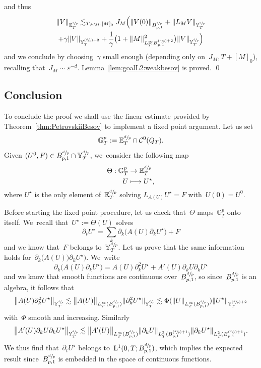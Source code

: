 \documentclass[JEP,XML,SOM,Unicode,published]{cedram}
\newcommand\mto{\mathchoice{\longmapsto}{\mapsto}{\mapsto}{\mapsto}}
\newcommand{\Psfrac}[2]{(\sfrac{#1}{#2})}
\theoremstyle{definition}
\renewcommand\L{\mathrm{L}}
\let\ep\varepsilon
\begin{document}
and thus
\begin{multline*}
\|V\|_{{\mathbb E}^{\sfrac dp}_T} \lesssim_{T,\omega_M,[M]_0} J_M\Bigl(\| V (0)\|_{B^{\sfrac dp}_{p,1}} + \| L_{M }V\|_{{\mathbb Y}^{\sfrac dp}_T} \\+ \gamma \|V\|_{{{\mathbb Y}^{\Psfrac dp+2}_T }} + \frac1\gamma\bigl(1+ \|M\|^2_{{L^\infty_T B^{\Psfrac dp+2}_{p,1} }} \bigr) \| V \|_{{\mathbb Y}^{\sfrac dp}_T} \Bigr)
\end{multline*}
and we conclude by choosing~$\gamma$ small enough (depending only on~$J_M, T + [M]_0$), recalling that~$J_M \sim \ep^{-d}$.
Lemma~\ref{lem:goalL2:weakbesov} is proved. \qed

\subsection{Conclusion}
To conclude the proof we shall use the linear estimate provided by Theorem~\ref{thm:PetrovskiiBesov} to implement a fixed point argument. Let us set
\[
\mathbb G^p_T:={\mathbb E}^{\sfrac dp}_T \cap \mathcal C^0(Q_T).
\]
Given $(U^0,F)\in B^{\sfrac dp}_{p,1}\cap {\mathbb Y}^{\sfrac dp}_T$, we~consider the following map
\begin{align*}
\Theta: \mathbb G^p_T&\to {\mathbb E}^{\sfrac dp}_T \\
U &\mto U^\star,
\end{align*}
where $U^\star$ is the only element of~${\mathbb E}^{\sfrac dp}_T$ solving $L_{A(U)} U^\star = F$ with~$U(0) = U^0$.

Before starting the fixed point procedure, let us check that~$\Theta$ maps~$ \mathbb G^p_T$ onto itself. We~recall that~$U^\star:=\Theta(U)$ solves
\[
\partial_tU^\star = \sum_k \partial_k \bigl(A(U)\partial_kU^\star\bigr) + F
\]
and we know that~$F$ belongs to~$ {\mathbb Y}^{\sfrac dp}_T$. Let us prove that the same information holds for~$\partial_k \bigl(A(U)\bigr)\partial_kU^\star\bigr)$. We~write
\[
\partial_k \bigl(A(U)\partial_kU^\star\bigr) = A(U)\partial^2_kU^\star + A'(U)\partial_kU \partial_kU^\star
\]
and we know that smooth functions are continuous over~$B^{\sfrac dp}_{p,1}$, so since~$B^{\sfrac dp}_{p,1}$ is an algebra, it follows that
\[
\big\| A(U)\partial^2_kU^\star \big\| _{ {\mathbb Y}^{\sfrac dp}_T} \lesssim \big\| A(U) \big\| _{L^\infty_T(B^{\sfrac dp}_{p,1})} \|\partial^2_k U^\star\| _{ {\mathbb Y}^{\sfrac dp}_T} \lesssim \Phi(\| U \| _{L^\infty_T(B^{\sfrac dp}_{p,1})})\|U^\star\| _{ {\mathbb Y}^{\Psfrac dp+2}_T}
\]
with~$\Phi$ smooth and increasing. Similarly
\[
\big\| A'(U)\partial_kU \partial_kU^\star
\big\| _{ {\mathbb Y}^{\sfrac dp}_T} \lesssim \big\| A'(U) \big\| _{L^\infty_T(B^{\sfrac dp}_{p,1})} \|\partial_k U \| _{L^2_T(B^{\Psfrac dp+1}_{p,1})} \|\partial_k U^\star\| _{L^2_T(B^{\Psfrac dp+1}_{p,1})}.
\]
We thus find that~$ \partial_tU^\star$ belongs to~$\L^1(0,T;B^{\sfrac dp}_{p,1})$, which implies the expected result since~$B^{\sfrac dp}_{p,1}$ is embedded in the space of continuous functions.
\end{document}
